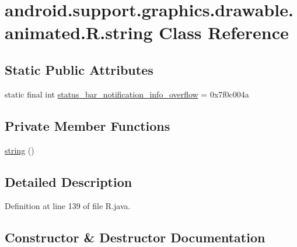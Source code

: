 \hypertarget{classandroid_1_1support_1_1graphics_1_1drawable_1_1animated_1_1_r_1_1string}{}\section{android.\+support.\+graphics.\+drawable.\+animated.\+R.\+string Class Reference}
\label{classandroid_1_1support_1_1graphics_1_1drawable_1_1animated_1_1_r_1_1string}
\subsection*{Static Public Attributes}
\begin{DoxyCompactItemize}
\item 
static final int \mbox{\hyperlink{classandroid_1_1support_1_1graphics_1_1drawable_1_1animated_1_1_r_1_1string_adb1e336cab06d5a619196b54c531a8fe}{status\+\_\+bar\+\_\+notification\+\_\+info\+\_\+overflow}} = 0x7f0c004a
\end{DoxyCompactItemize}
\subsection*{Private Member Functions}
\begin{DoxyCompactItemize}
\item 
\mbox{\hyperlink{classandroid_1_1support_1_1graphics_1_1drawable_1_1animated_1_1_r_1_1string_a6979d9a7a69f95bebb76b2bc8c047374}{string}} ()
\end{DoxyCompactItemize}


\subsection{Detailed Description}


Definition at line 139 of file R.\+java.



\subsection{Constructor \& Destructor Documentation}
\mbox{\label{classandroid_1_1support_1_1graphics_1_1drawable_1_1animated_1_1_r_1_1string_a6979d9a7a69f95bebb76b2bc8c047374}} 
